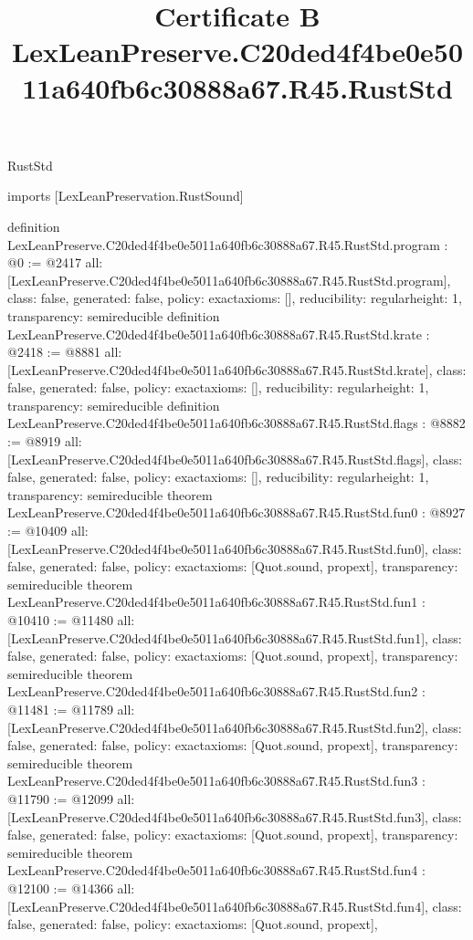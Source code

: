 \begin{lexlean}{RustStd}
\title{Certificate B LexLeanPreserve.C20ded4f4be0e5011a640fb6c30888a67.R45.RustStd}
\begin{coremodule}
imports [LexLeanPreservation.RustSound]

definition LexLeanPreserve.C20ded4f4be0e5011a640fb6c30888a67.R45.RustStd.program : @0 := @2417 {
  all: [LexLeanPreserve.C20ded4f4be0e5011a640fb6c30888a67.R45.RustStd.program],
  class: false,
  generated: false,
  policy: exact{axioms: []},
  reducibility: regular{height: 1},
  transparency: semireducible
}
definition LexLeanPreserve.C20ded4f4be0e5011a640fb6c30888a67.R45.RustStd.krate : @2418 := @8881 {
  all: [LexLeanPreserve.C20ded4f4be0e5011a640fb6c30888a67.R45.RustStd.krate],
  class: false,
  generated: false,
  policy: exact{axioms: []},
  reducibility: regular{height: 1},
  transparency: semireducible
}
definition LexLeanPreserve.C20ded4f4be0e5011a640fb6c30888a67.R45.RustStd.flags : @8882 := @8919 {
  all: [LexLeanPreserve.C20ded4f4be0e5011a640fb6c30888a67.R45.RustStd.flags],
  class: false,
  generated: false,
  policy: exact{axioms: []},
  reducibility: regular{height: 1},
  transparency: semireducible
}
theorem LexLeanPreserve.C20ded4f4be0e5011a640fb6c30888a67.R45.RustStd.fun0 : @8927 := @10409 {
  all: [LexLeanPreserve.C20ded4f4be0e5011a640fb6c30888a67.R45.RustStd.fun0],
  class: false,
  generated: false,
  policy: exact{axioms: [Quot.sound, propext]},
  transparency: semireducible
}
theorem LexLeanPreserve.C20ded4f4be0e5011a640fb6c30888a67.R45.RustStd.fun1 : @10410 := @11480 {
  all: [LexLeanPreserve.C20ded4f4be0e5011a640fb6c30888a67.R45.RustStd.fun1],
  class: false,
  generated: false,
  policy: exact{axioms: [Quot.sound, propext]},
  transparency: semireducible
}
theorem LexLeanPreserve.C20ded4f4be0e5011a640fb6c30888a67.R45.RustStd.fun2 : @11481 := @11789 {
  all: [LexLeanPreserve.C20ded4f4be0e5011a640fb6c30888a67.R45.RustStd.fun2],
  class: false,
  generated: false,
  policy: exact{axioms: [Quot.sound, propext]},
  transparency: semireducible
}
theorem LexLeanPreserve.C20ded4f4be0e5011a640fb6c30888a67.R45.RustStd.fun3 : @11790 := @12099 {
  all: [LexLeanPreserve.C20ded4f4be0e5011a640fb6c30888a67.R45.RustStd.fun3],
  class: false,
  generated: false,
  policy: exact{axioms: [Quot.sound, propext]},
  transparency: semireducible
}
theorem LexLeanPreserve.C20ded4f4be0e5011a640fb6c30888a67.R45.RustStd.fun4 : @12100 := @14366 {
  all: [LexLeanPreserve.C20ded4f4be0e5011a640fb6c30888a67.R45.RustStd.fun4],
  class: false,
  generated: false,
  policy: exact{axioms: [Quot.sound, propext]},
}
\end{coremodule}
\end{lexlean}
